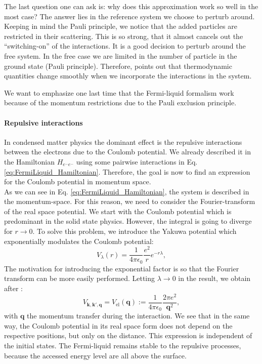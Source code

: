 \documentclass[../main.tex]{subfile}
\begin{document}
The last question one can ask is: why does this approximation work so well in the most case? The answer lies in the reference system
we choose to perturb around. Keeping in mind the Pauli principle, we notice that the added particles are restricted in their scattering.
This is so strong, that it almost cancels out the ``switching-on'' of the interactions. It is a good decision to perturb around
the free system. In the free case we are limited in the number of particle in the ground state (Pauli principle).
Therefore, \cite{FossheimSudbo2004} points out that thermodynamic quantities change smoothly when we incorporate the interactions
in the system.

We want to emphasize one last time that the Fermi-liquid formalism work because of the momentum restrictions
due to the Pauli exclusion principle.


\paragraph{Repulsive interactions}$~$\\

In condensed matter physics the dominant effect is the repulsive interactions between the electrons due to the Coulomb potential.
 We already described it in the Hamiltonian 
$H_{e^-e^-}$ using some pairwise interactions in Eq. \ref{eq:FermiLiquid_Hamiltonian}. Therefore, the goal is now to
 find an expression for the Coulomb potential in momentum space.\\

As we can see in Eq. \ref{eq:FermiLiquid_Hamiltonian}, the system is described in the momentum-space. For this reason, we need to 
consider the Fourier-transform of the real space potential. We start with the Coulomb potential which is predominant in the solid state physics.
However, the integral is going to diverge for $r\rightarrow 0$. To solve this problem, we
introduce the Yakuwa potential which exponentially modulates the Coulomb potential:
\begin{equation}
    V_{\lambda}(r) = \frac{1}{4\pi\epsilon_0} \frac{e^2}{r} e^{-r\lambda}, \label{eq:Yakuma}
\end{equation}
The motivation for introducing the exponential factor is so that the Fourier transform can be more easily performed.
Letting $\lambda\rightarrow 0$ in the result, we obtain after \cite{Cupcake}:
\begin{equation} \label{eq:Pot_repulsive_el}
    V_{\bm{k},\bm{k}',\bm{q}} = V_{\text{el}}(\bm{q}) := \frac{1}{4\pi\epsilon_0} \frac{2\pi e^2}{\bm{q}^2},
\end{equation}
with $\bm{q}$ the momentum transfer during the interaction. We see that in the same way, the Coulomb potential in its real
 space form does not depend on the respective positions, but only on the distance. 
This expression is independent of the initial states. 
The Fermi-liquid remains stable to the repulsive processes, because the accessed energy level are all above the surface.\\
\end{document}
